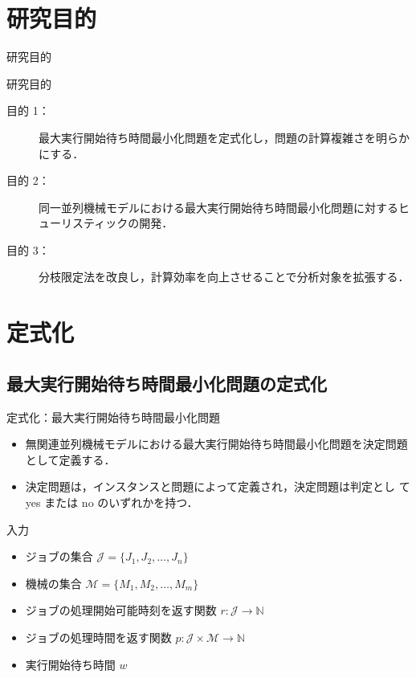 \documentclass[dvipdfmx]{beamer}
\begin{document}
\section{研究目的}
\begin{frame}{研究目的}
  \begin{block}{研究目的}
    \begin{description}
      \item[目的 1：] 最大実行開始待ち時間最小化問題を定式化し，問題の計算複雑さを明らかにする．
      \item[目的 2：] 同一並列機械モデルにおける最大実行開始待ち時間最小化問題に対するヒューリスティックの開発．
      \item[目的 3：] 分枝限定法を改良し，計算効率を向上させることで分析対象を拡張する．
    \end{description}
  \end{block}
\end{frame}
\section{定式化}

\subsection{最大実行開始待ち時間最小化問題の定式化}
\begin{frame}{定式化：最大実行開始待ち時間最小化問題}
  \begin{itemize}
    \item {無関連並列機械モデルにおける最大実行開始待ち時間最小化問題を決定問題として定義する．}
    \item {決定問題は，インスタンスと問題によって定義され，決定問題は判定とし
    て yes または no のいずれかを持つ．}
  \end{itemize}
  \begin{block}{入力}
    \begin{itemize}
      \item {ジョブの集合 $\mathcal{J} = \{J_1,J_2,\ldots,J_n\}$}
      \item {機械の集合 $\mathcal{M} = \{M_1,M_2,\ldots,M_m\}$}
      \item {ジョブの処理開始可能時刻を返す関数 $r : \mathcal{J} \to \mathbb{N}$}
      \item {ジョブの処理時間を返す関数 $p : \mathcal{J} \times \mathcal{M} \to \mathbb{N}$}
      \item {実行開始待ち時間 $w$}
    \end{itemize}
  \end{block}
\end{frame}
\end{document}
